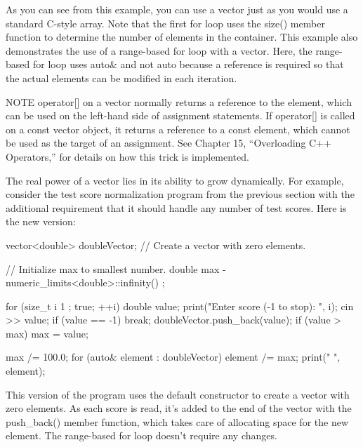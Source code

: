 As you can see from this example, you can use a vector just as you would use a standard C-style array. Note that the first for loop uses the size() member function to determine the number of elements in the container. This example also demonstrates the use of a range-based for loop with a vector. Here, the range-based for loop uses auto\& and not auto because a reference is required so that the actual elements can be modified in each iteration.

\begin{myNotic}{NOTE}
operator[] on a vector normally returns a reference to the element, which can be used on the left-hand side of assignment statements. If operator[] is called on a const vector object, it returns a reference to a const element, which cannot be used as the target of an assignment. See Chapter 15, “Overloading C++ Operators,” for details on how this trick is implemented.
\end{myNotic}


The real power of a vector lies in its ability to grow dynamically. For example, consider the test score normalization program from the previous section with the additional requirement that it should handle any number of test scores. Here is the new version:

\begin{cpp}
vector<double> doubleVector; // Create a vector with zero elements.

// Initialize max to smallest number.
double max { -numeric_limits<double>::infinity() };

for (size_t i { 1 }; true; ++i) {
    double value;
    print("Enter score {} (-1 to stop): ", i);
    cin >> value;
    if (value == -1) {
        break;
    }
    doubleVector.push_back(value);
    if (value > max) {
        max = value;
    }
}

max /= 100.0;
for (auto& element : doubleVector) {
    element /= max;
    print("{} ", element);
}
\end{cpp}

This version of the program uses the default constructor to create a vector with zero elements. As each score is read, it’s added to the end of the vector with the push\_back() member function, which takes care of allocating space for the new element. The range-based for loop doesn’t require any changes.



